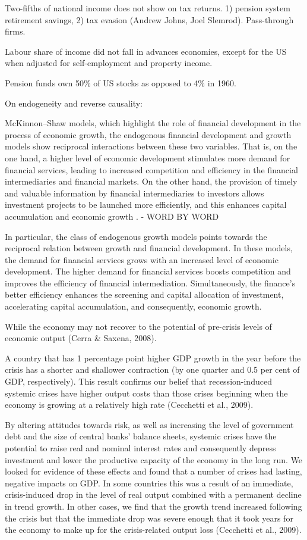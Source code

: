 \documentclass[a4paper,11pt]{article}
\begin{document}
Two-fifths of national income does not show on tax returns. 1) pension system retirement savings, 2) tax evasion (Andrew Johns, Joel Slemrod). Pass-through firms.

Labour share of income did not fall in advances economies, except for the US when adjusted for self-employment and property income.

Pension funds own 50\% of US stocks as opposed to 4\% in 1960.

On endogeneity and reverse causality:

McKinnon–Shaw models, which highlight the role of financial development in the process of economic growth, the endogenous financial development and growth models show reciprocal interactions between these two variables. That is, on the one hand, a higher level of economic development stimulates more demand for financial services, leading to increased competition and efficiency in the financial intermediaries and financial markets. On the other hand, the provision of timely and valuable information by financial intermediaries to investors allows investment projects to be launched more efficiently, and this enhances capital accumulation and economic growth \parencite{Ang2008}. - WORD BY WORD

In particular, the class of endogenous growth models points towards the reciprocal relation between growth and financial development. In these models, the demand for financial services grows with an increased level of economic development. The higher demand for financial services boosts competition and improves the efficiency of financial intermediation. Simultaneously, the finance's better efficiency enhances the screening and capital allocation of investment, accelerating capital accumulation, and consequently, economic growth.

While the economy may not recover to the potential of pre-crisis levels of economic output (Cerra \& Saxena, 2008).

A country that has 1 percentage point higher GDP growth in the year before the crisis has a shorter and shallower contraction (by one quarter and 0.5 per cent of GDP, respectively). This result confirms our belief that recession-induced systemic crises have higher output costs than those crises beginning when the economy is growing at a relatively high rate (Cecchetti et al., 2009).

By altering attitudes towards risk, as well as increasing the level of government debt and the size of central banks’ balance sheets, systemic crises have the potential to raise real and nominal interest rates and consequently depress investment and lower the productive capacity of the economy in the long run. We looked for evidence of these effects and found
that a number of crises had lasting, negative impacts on GDP. In some countries this was a result of an immediate, crisis-induced drop in the level of real output combined with a permanent decline in trend growth. In other cases, we find that the growth trend increased following the crisis but that the immediate drop was severe enough that it took years for the
economy to make up for the crisis-related output loss (Cecchetti et al., 2009). 
\end{document}
